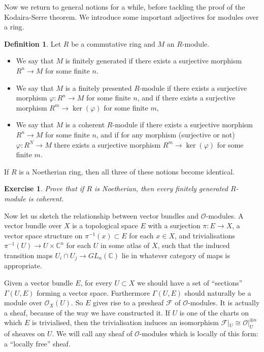 \documentclass[12pt]{article}
\theoremstyle{plain}
\newtheorem{exer}[thm]{Exercise}
\theoremstyle{definition}
\newtheorem{defn}{Definition}[section]
\numberwithin{equation}{section}
\newcommand{\C}{\mathbb{C}}
\newcommand{\CF}{\mathcal{F}}
\newcommand{\OO}{\mathcal{O}}
\begin{document}
Now we return to general notions for a while, before tackling the proof of the Kodaira-Serre theorem. We introduce some important adjectives for modules over a ring.
\begin{defn}
Let $R$ be a commutative ring and $M$ an $R$-module.
\begin{itemize}
\item We say that $M$ is finitely generated if there exists a surjective morphism $R^n \rightarrow M$ for some finite $n$.

\item We say that $M$ is a finitely presented $R$-module if there exists a surjective morphism $\varphi : R^n \rightarrow M$ for some finite $n$, and if there exists a surjective morphism $R^m \rightarrow \ker(\varphi)$ for some finite $m$,

\item We say that $M$ is a coherent $R$-module if there exists a surjective morphism $R^n \rightarrow M$ for some finite $n$, and if for any morphism (surjective or not) $\varphi : R^N \rightarrow M$ there exists a surjective morphism $R^m \rightarrow \ker(\varphi)$ for some finite $m$.
\end{itemize}
\end{defn}

If $R$ is a Noetherian ring, then all three of these notions become identical.
\begin{exer}
Prove that if $R$ is Noetherian, then every finitely generated $R$-module is coherent.
\end{exer}


Now let us sketch the relationship between vector bundles and $\OO$-modules. A vector bundle over $X$ is a topological space $E$ with a surjection $\pi : E \rightarrow X$, a vector space structure on $\pi^{-1}(x) \subset E$ for each $x \in X$, and trivialisations $\pi^{-1}(U) \rightarrow U \times \C^n$ for each $U$ in some atlas of $X$, such that the induced transition maps $U_i \cap U_j \rightarrow GL_n(\C)$ lie in whatever category of maps is appropriate.

Given a vector bundle $E$, for every $U \subset X$ we should have a set of ``sections'' $\Gamma(U, E)$ forming a vector space. Furthermore $\Gamma(U, E)$ should naturally be a module over $\OO_X(U)$. So $E$ gives rise to a presheaf $\CF$ of $\OO$-modules. It is actually a sheaf, because of the way we have constructed it. If $U$ is one of the charts on which $E$ is trivialised, then the trivialisation induces an isomorphism $\CF|_U \cong \OO|_U^{\oplus n}$ of sheaves on $U$. We will call any sheaf of $\OO$-modules which is locally of this form: a ``locally free'' sheaf.
\end{document}
